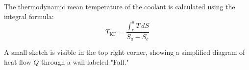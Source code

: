 The thermodynamic mean temperature of the coolant is calculated using the integral formula:  
\[
T_{\text{KF}} = \frac{\int_{e}^{a} T \, dS}{S_a - S_e}
\]  

A small sketch is visible in the top right corner, showing a simplified diagram of heat flow \( \dot{Q} \) through a wall labeled "Fall."